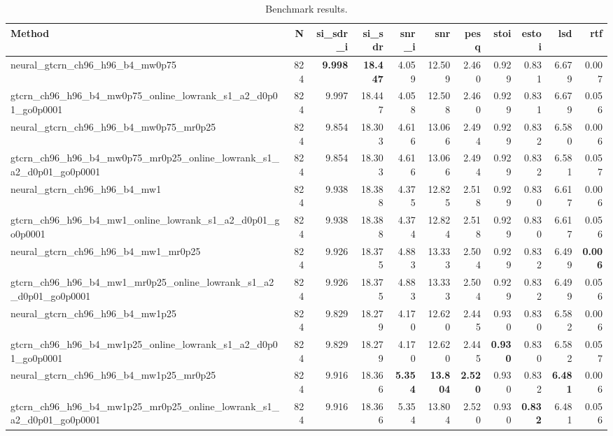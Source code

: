 \begin{table}[t]
\centering
\caption{Benchmark results.}
\label{tab:bench}
\begin{tabular}{lrrrrrrrrrr}
\toprule
Method & N & si\_sdr\_i & si\_sdr & snr\_i & snr & pesq & stoi & estoi & lsd & rtf \\
\midrule
neural_gtcrn_ch96_h96_b4_mw0p75 & 824 & \textbf{9.998} & \textbf{18.447} & 4.059 & 12.509 & 2.460 & 0.929 & 0.831 & 6.679 & 0.007 \\
gtcrn_ch96_h96_b4_mw0p75_online_lowrank_s1_a2_d0p01_go0p0001 & 824 & 9.997 & 18.447 & 4.058 & 12.508 & 2.460 & 0.929 & 0.831 & 6.679 & 0.056 \\
neural_gtcrn_ch96_h96_b4_mw0p75_mr0p25 & 824 & 9.854 & 18.303 & 4.616 & 13.066 & 2.494 & 0.929 & 0.832 & 6.580 & 0.006 \\
gtcrn_ch96_h96_b4_mw0p75_mr0p25_online_lowrank_s1_a2_d0p01_go0p0001 & 824 & 9.854 & 18.303 & 4.616 & 13.066 & 2.494 & 0.929 & 0.832 & 6.581 & 0.057 \\
neural_gtcrn_ch96_h96_b4_mw1 & 824 & 9.938 & 18.388 & 4.375 & 12.825 & 2.518 & 0.929 & 0.830 & 6.617 & 0.006 \\
gtcrn_ch96_h96_b4_mw1_online_lowrank_s1_a2_d0p01_go0p0001 & 824 & 9.938 & 18.388 & 4.374 & 12.824 & 2.518 & 0.929 & 0.830 & 6.617 & 0.056 \\
neural_gtcrn_ch96_h96_b4_mw1_mr0p25 & 824 & 9.926 & 18.375 & 4.883 & 13.333 & 2.504 & 0.929 & 0.832 & 6.499 & \textbf{0.006} \\
gtcrn_ch96_h96_b4_mw1_mr0p25_online_lowrank_s1_a2_d0p01_go0p0001 & 824 & 9.926 & 18.375 & 4.883 & 13.333 & 2.504 & 0.929 & 0.832 & 6.499 & 0.056 \\
neural_gtcrn_ch96_h96_b4_mw1p25 & 824 & 9.829 & 18.279 & 4.170 & 12.620 & 2.445 & 0.930 & 0.830 & 6.582 & 0.006 \\
gtcrn_ch96_h96_b4_mw1p25_online_lowrank_s1_a2_d0p01_go0p0001 & 824 & 9.829 & 18.279 & 4.170 & 12.620 & 2.445 & \textbf{0.930} & 0.830 & 6.582 & 0.057 \\
neural_gtcrn_ch96_h96_b4_mw1p25_mr0p25 & 824 & 9.916 & 18.366 & \textbf{5.354} & \textbf{13.804} & \textbf{2.520} & 0.930 & 0.832 & \textbf{6.481} & 0.006 \\
gtcrn_ch96_h96_b4_mw1p25_mr0p25_online_lowrank_s1_a2_d0p01_go0p0001 & 824 & 9.916 & 18.366 & 5.354 & 13.804 & 2.520 & 0.930 & \textbf{0.832} & 6.481 & 0.056 \\
\bottomrule
\end{tabular}
\end{table}